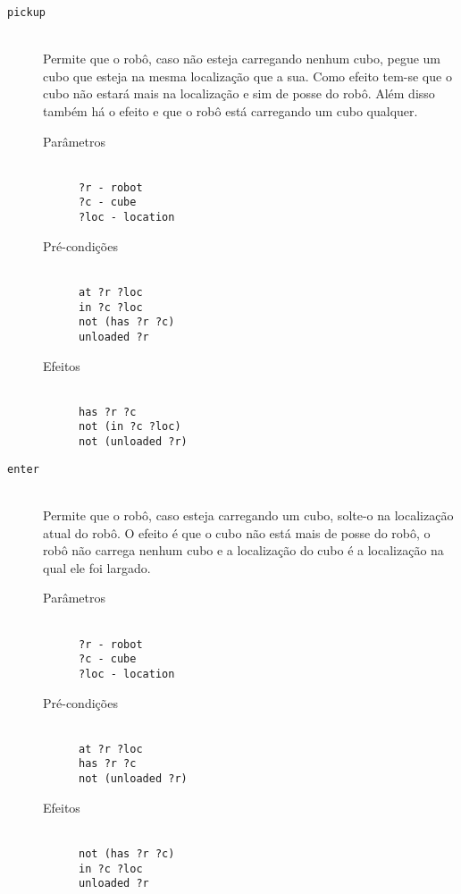 \documentclass[letterpaper]{article}
\begin{document}
\begin{description}
\item[\texttt{pickup}] \hfill\\
  Permite que o robô, caso não esteja carregando nenhum cubo, pegue um cubo que esteja na mesma localização que a sua. 
  Como efeito tem-se que o cubo não estará mais na localização e sim de posse do robô. Além disso também há o efeito e 
  que o robô está carregando um cubo qualquer.
    \begin{description}
      \item[Parâmetros] \hfill\\
        \texttt{?r - robot\\?c - cube\\?loc - location}
      \item[Pré-condições] \hfill\\
        \texttt{at ?r ?loc\\in ?c ?loc\\not (has ?r ?c)\\unloaded ?r}
      \item[Efeitos] \hfill\\
        \texttt{has ?r ?c\\not (in ?c ?loc)\\not (unloaded ?r)}
    \end{description}

\item[\texttt{enter}] \hfill\\
  Permite que o robô, caso esteja carregando um cubo, solte-o na localização atual do robô. O efeito é que o cubo não 
  está mais de posse do robô, o robô não carrega nenhum cubo e a localização do cubo é a localização na qual ele foi 
  largado.
    \begin{description}
      \item[Parâmetros] \hfill\\
        \texttt{?r - robot\\?c - cube\\?loc - location}
      \item[Pré-condições] \hfill\\
        \texttt{at ?r ?loc\\has ?r ?c\\not (unloaded ?r)}
      \item[Efeitos] \hfill\\
        \texttt{not (has ?r ?c)\\in ?c ?loc\\unloaded ?r}
    \end{description}
\end{description}
\end{document}

